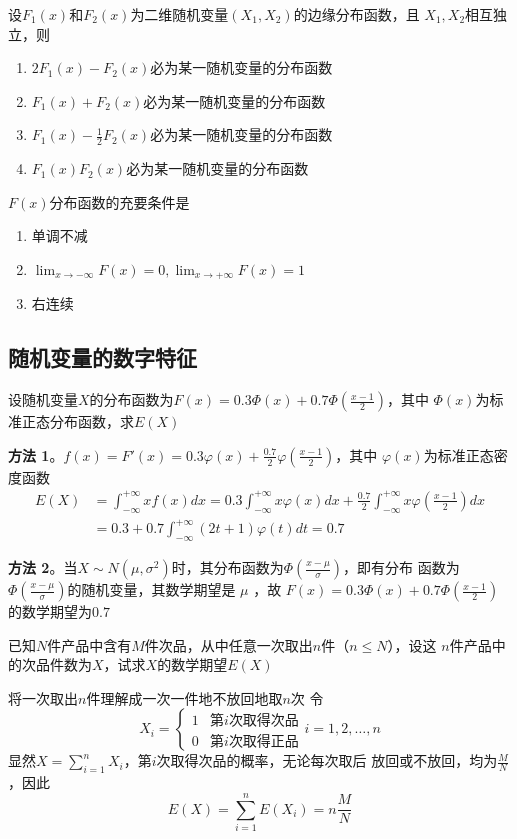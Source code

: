 \documentclass{article}
\begin{document}
\begin{examplle}[]
设\(F_1(x)\)和\(F_2(x)\)为二维随机变量\((X_1,X_2)\)的边缘分布函数，且
\(X_1,X_2\)相互独立，则
\begin{enumerate}
\item \(2F_1(x)-F_2(x)\)必为某一随机变量的分布函数
\item \(F_1(x)+F_2(x)\)必为某一随机变量的分布函数
\item \(F_1(x)-\frac{1}{2}F_2(x)\)必为某一随机变量的分布函数
\item \(F_1(x)F_2(x)\)必为某一随机变量的分布函数
\end{enumerate}


\(F(x)\)分布函数的充要条件是
\begin{enumerate}
\item 单调不减
\item \(\displaystyle\lim_{x\to-\infty}F(x)=0,\lim_{x\to+\infty}F(x)=1\)
\item 右连续
\end{enumerate}
\end{examplle}
\subsection{随机变量的数字特征}
\label{sec:org9151bf7}
\begin{examplle}[]
设随机变量\(X\)的分布函数为\(F(x)=0.3\Phi(x)+0.7\Phi(\frac{x-1}{2})\)，其中
\(\Phi(x)\)为标准正态分布函数，求\(E(X)\)

\textbf{方法 1}。\(f(x)=F'(x)=0.3\varphi(x)+\frac{0.7}{2}\varphi(\frac{x-1}{2})\)，其中
 \(\varphi(x)\)为标准正态密度函数
\begin{align*}
E(X)&=\int_{-\infty}^{+\infty}xf(x)dx=0.3\int_{-\infty}^{+\infty}x\varphi(x)dx+
\frac{0.7}{2}\int_{-\infty}^{+\infty}x\varphi(\frac{x-1}{2})dx\\
&=0.3+0.7\int_{-\infty}^{+\infty}(2t+1)\varphi(t)dt=0.7
\end{align*}

\textbf{方法 2}。当\(X\sim N(\mu,\sigma^2)\)时，其分布函数为\(\Phi(\frac{x-\mu}{\sigma})\)，即有分布
 函数为\(\Phi(\frac{x-\mu}{\sigma})\)的随机变量，其数学期望是 \(\mu\) ，故
 \(F(x)=0.3\Phi(x)+0.7\Phi(\frac{x-1}{2})\)的数学期望为\(0.7\)
\end{examplle}

\begin{examplle}[]
已知\(N\)件产品中含有\(M\)件次品，从中任意一次取出\(n\)件（\(n\le N\)），设这
\(n\)件产品中的次品件数为\(X\)，试求\(X\)的数学期望\(E(X)\)

将一次取出\(n\)件理解成一次一件地不放回地取\(n\)次
令
\begin{equation*}
X_i=
\begin{cases}
1&\text{第$i$次取得次品}\\
0&\text{第$i$次取得正品}
\end{cases}
i=1,2,\dots,n
\end{equation*}
显然\(X=\displaystyle\sum_{i=1}^nX_i\)，第\(i\)次取得次品的概率，无论每次取后
放回或不放回，均为\(\frac{M}{N}\)，因此
\begin{equation*}
E(X)=\sum_{i=1}^nE(X_i)=n\frac{M}{N}
\end{equation*}
\end{examplle}
\end{document}
